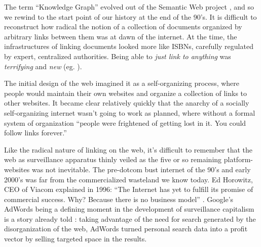 The term ``Knowledge Graph'' evolved out of the Semantic Web project
\cite{hitzlerReviewSemanticWeb2021} , and so we rewind to the
start point of our history at the end of the 90's. It is difficult to
reconstruct how radical the notion of a collection of documents
organized by arbitrary links between them was at dawn of the internet.
At the time, the infrastructures of linking documents looked more like
ISBNs, carefully regulated by expert, centralized
authorities. Being able to
\emph{just link to anything} was \emph{terrifying} and \emph{new} (eg.
\cite{berners-leeLinksLaw1997, berners-leeLinksLawMyths1997} ).

The initial design of the web imagined it as a self-organizing process,
where people would maintain their own websites and organize a collection
of links to other websites. It
became clear relatively quickly that the anarchy of a socially
self-organizing internet wasn't going to work as planned, where without
a formal system of organization ``people were frightened of getting lost
in it. You could follow links forever.'' \cite{berners-leeWhatSemanticWeb1998} 

Like the radical nature of linking on the web, it's difficult to
remember that the web as surveillance apparatus thinly veiled as the
five or so remaining platform-websites was not inevitable. The
pre-dotcom bust internet of the 90's and early 2000's was far from the
commercialized wasteland we know today. Ed Horowitz, CEO of Viacom
explained in 1996: ``The Internet has yet to fulfill its promise of
commercial success. Why? Because there is no business model'' \cite{tarnoffInternetPeopleFight2022} . Google's AdWords being a defining
moment in the development of surveillance capitalism is a story already
told \cite{zuboffAgeSurveillanceCapitalism2019} : taking
advantage of the need for search generated by the disorganization of the
web, AdWords turned personal search data into a profit vector by selling
targeted space in the results.

